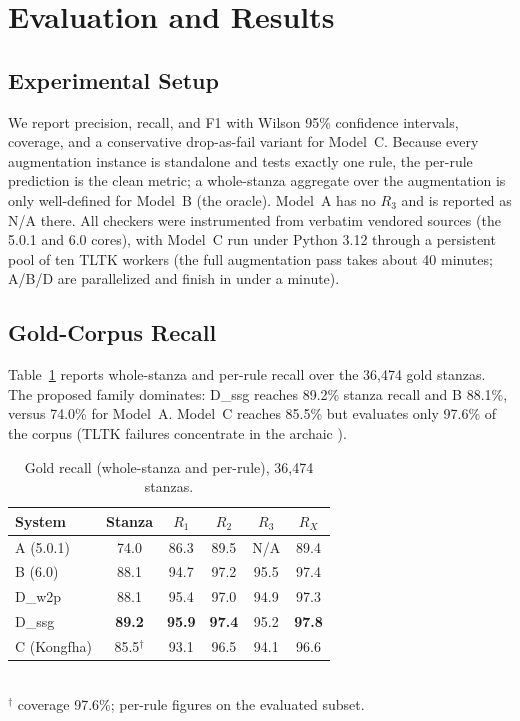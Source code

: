 \documentclass[conference]{IEEEtran}
\begin{document}

\section{Evaluation and Results}
\label{sec:results}

\subsection{Experimental Setup}

We report precision, recall, and F1 with Wilson 95\% confidence intervals,
coverage, and a conservative drop-as-fail variant for Model~C. Because
every augmentation instance is standalone and tests exactly one rule, the
per-rule prediction is the clean metric; a whole-stanza aggregate over the
augmentation is only well-defined for Model~B (the oracle). Model~A has no
$R_3$ and is reported as N/A there. All checkers were instrumented from
verbatim vendored sources (the 5.0.1 and 6.0 cores), with Model~C run
under Python 3.12 through a persistent pool of ten TLTK workers (the full
augmentation pass takes about 40 minutes; A/B/D are parallelized and finish
in under a minute).

\subsection{Gold-Corpus Recall}

Table~\ref{tab:gold} reports whole-stanza and per-rule recall over the
36{,}474 gold stanzas. The proposed family dominates: D\_ssg reaches
89.2\% stanza recall and B 88.1\%, versus 74.0\% for Model~A. Model~C
reaches 85.5\% but evaluates only 97.6\% of the corpus (TLTK failures
concentrate in the archaic \emph{}).

\begin{table}[t]
\caption{Gold recall (whole-stanza and per-rule), 36{,}474 stanzas.}
\label{tab:gold}
\centering
\footnotesize
\begin{tabular}{lccccc}
\toprule
System & Stanza & $R_1$ & $R_2$ & $R_3$ & $R_X$ \\
\midrule
A (5.0.1) & 74.0 & 86.3 & 89.5 & N/A & 89.4 \\
B (6.0) & 88.1 & 94.7 & 97.2 & 95.5 & 97.4 \\
D\_w2p & 88.1 & 95.4 & 97.0 & 94.9 & 97.3 \\
D\_ssg & \textbf{89.2} & \textbf{95.9} & \textbf{97.4} & 95.2 & \textbf{97.8} \\
C (Kongfha) & 85.5$^{\dagger}$ & 93.1 & 96.5 & 94.1 & 96.6 \\
\bottomrule
\end{tabular}
\\[2pt]
\footnotesize $^{\dagger}$ coverage 97.6\%; per-rule figures on the
evaluated subset.
\end{table}
\end{document}
